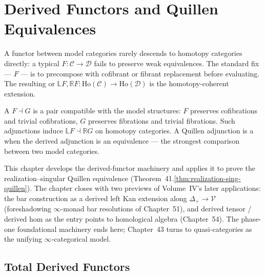 
\chapter{Derived Functors and Quillen Equivalences}

\begin{overviewbox}
A functor between model categories rarely descends to homotopy categories
directly: a typical $F : \mathcal{C} \to \mathcal{D}$ fails to preserve
weak equivalences. The standard fix —  $F$ — is to precompose
with cofibrant or fibrant replacement before evaluating. The resulting
 or  $\mathbb{L}F,
\mathbb{R}F : \mathrm{Ho}(\mathcal{C}) \to \mathrm{Ho}(\mathcal{D})$ is
the homotopy-coherent extension.

A  $F \dashv G$ is a pair compatible with the
model structures: $F$ preserves cofibrations and trivial cofibrations,
$G$ preserves fibrations and trivial fibrations. Such adjunctions induce
 $\mathbb{L}F \dashv \mathbb{R}G$ on homotopy
categories. A Quillen adjunction is a  when the
derived adjunction is an equivalence — the strongest comparison between
two model categories.

This chapter develops the derived-functor machinery and applies it to
prove the realization–singular Quillen equivalence (Theorem~41.\ref{thm:realization-sing-quillen}).
The chapter closes with two previews of Volume~IV's later applications:
the bar construction as a derived left Kan extension along $\Delta_+
\to \mathcal{V}$ (foreshadowing $\infty$-monad bar resolutions of
Chapter~51), and derived tensor / derived hom as the entry points to
homological algebra (Chapter~54). The phase-one foundational machinery
ends here; Chapter~43 turns to quasi-categories as the unifying
$\infty$-categorical model.
\end{overviewbox}


\section{Total Derived Functors}
\label{sec:total-derived}


